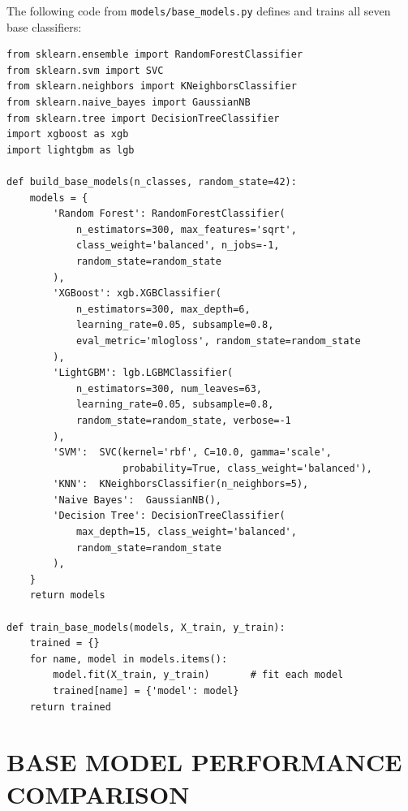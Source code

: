 \documentclass[12pt,a4paper,oneside]{report}
\begin{document}
The following code from \texttt{models/base\_models.py} defines and trains all seven base classifiers:

\begin{singlespacing}
\begin{lstlisting}[caption={models/base\_models.py --- Build and Train Base Classifiers}]
from sklearn.ensemble import RandomForestClassifier
from sklearn.svm import SVC
from sklearn.neighbors import KNeighborsClassifier
from sklearn.naive_bayes import GaussianNB
from sklearn.tree import DecisionTreeClassifier
import xgboost as xgb
import lightgbm as lgb

def build_base_models(n_classes, random_state=42):
    models = {
        'Random Forest': RandomForestClassifier(
            n_estimators=300, max_features='sqrt',
            class_weight='balanced', n_jobs=-1,
            random_state=random_state
        ),
        'XGBoost': xgb.XGBClassifier(
            n_estimators=300, max_depth=6,
            learning_rate=0.05, subsample=0.8,
            eval_metric='mlogloss', random_state=random_state
        ),
        'LightGBM': lgb.LGBMClassifier(
            n_estimators=300, num_leaves=63,
            learning_rate=0.05, subsample=0.8,
            random_state=random_state, verbose=-1
        ),
        'SVM':  SVC(kernel='rbf', C=10.0, gamma='scale',
                    probability=True, class_weight='balanced'),
        'KNN':  KNeighborsClassifier(n_neighbors=5),
        'Naive Bayes':  GaussianNB(),
        'Decision Tree': DecisionTreeClassifier(
            max_depth=15, class_weight='balanced',
            random_state=random_state
        ),
    }
    return models

def train_base_models(models, X_train, y_train):
    trained = {}
    for name, model in models.items():
        model.fit(X_train, y_train)       # fit each model
        trained[name] = {'model': model}
    return trained
\end{lstlisting}
\end{singlespacing}

\section{BASE MODEL PERFORMANCE COMPARISON}
\end{document}
